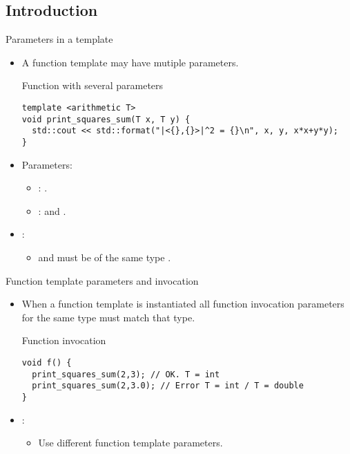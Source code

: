 \subsection{Introduction}

\begin{frame}[t,fragile]{Parameters in a template}
\begin{itemize}
  \item A function template may have mutiple parameters.

\begin{block}{Function with several parameters}
\begin{lstlisting}
template <arithmetic T>
void print_squares_sum(T x, T y) {
  std::cout << std::format("|<{},{}>|^2 = {}\n", x, y, x*x+y*y);
}
\end{lstlisting}
\end{block}

  \item Parameters:
    \begin{itemize}
      \item {}: .
      \item {}:  and .
    \end{itemize}

  \item {}:
    \begin{itemize}
      \item {} and  must be of the same type .
    \end{itemize}

\end{itemize}
\end{frame}

\begin{frame}[t,fragile]{Function template parameters and invocation}
\begin{itemize}
  \item When a function template is instantiated all function invocation parameters
        for the same type must match that type.

\begin{block}{Function invocation}
\begin{lstlisting}
void f() {
  print_squares_sum(2,3); // OK. T = int
  print_squares_sum(2,3.0); // Error T = int / T = double
}
\end{lstlisting}
\end{block}

  \item {}:
    \begin{itemize}
      \item Use different function template parameters.
    \end{itemize}
\end{itemize}
\end{frame}
